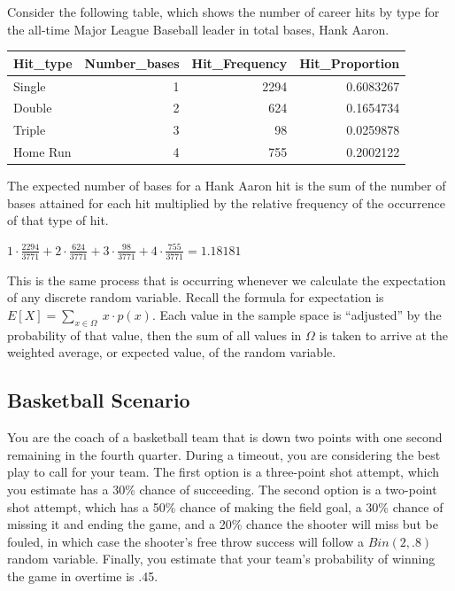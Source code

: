\documentclass[
  11pt,
]{book}
\theoremstyle{definition}
\theoremstyle{definition}
\theoremstyle{definition}
\theoremstyle{definition}
\theoremstyle{remark}
\begin{document}
Consider the following table, which shows the number of career hits by type for the all-time Major League Baseball leader in total bases, Hank Aaron.

\begin{table}
\centering
\begin{tabular}[t]{l|r|r|r}
\hline
Hit\_type & Number\_bases & Hit\_Frequency & Hit\_Proportion\\
\hline
Single & 1 & 2294 & 0.6083267\\
\hline
Double & 2 & 624 & 0.1654734\\
\hline
Triple & 3 & 98 & 0.0259878\\
\hline
Home Run & 4 & 755 & 0.2002122\\
\hline
\end{tabular}
\end{table}

The expected number of bases for a Hank Aaron hit is the sum of the number of bases attained for each hit multiplied by the relative frequency of the occurrence of that type of hit.

\(1 \cdot \frac{2294}{3771} + 2 \cdot \frac{624}{3771} + 3 \cdot \frac{98}{3771} + 4 \cdot \frac{755}{3771} = 1.18181\)

This is the same process that is occurring whenever we calculate the expectation of any discrete random variable. Recall the formula for expectation is \(E[X] = \sum_{x \in \Omega}\ x \cdot p(x)\). Each value in the sample space is ``adjusted'' by the probability of that value, then the sum of all values in \(\Omega\) is taken to arrive at the weighted average, or expected value, of the random variable.

\hypertarget{basketball-scenario}{%
\subsection{Basketball Scenario}\label{basketball-scenario}}

You are the coach of a basketball team that is down two points with one second remaining in the fourth quarter. During a timeout, you are considering the best play to call for your team. The first option is a three-point shot attempt, which you estimate has a 30\% chance of succeeding. The second option is a two-point shot attempt, which has a 50\% chance of making the field goal, a 30\% chance of missing it and ending the game, and a 20\% chance the shooter will miss but be fouled, in which case the shooter's free throw success will follow a \(Bin(2, .8)\) random variable. Finally, you estimate that your team's probability of winning the game in overtime is .45.
\end{document}
